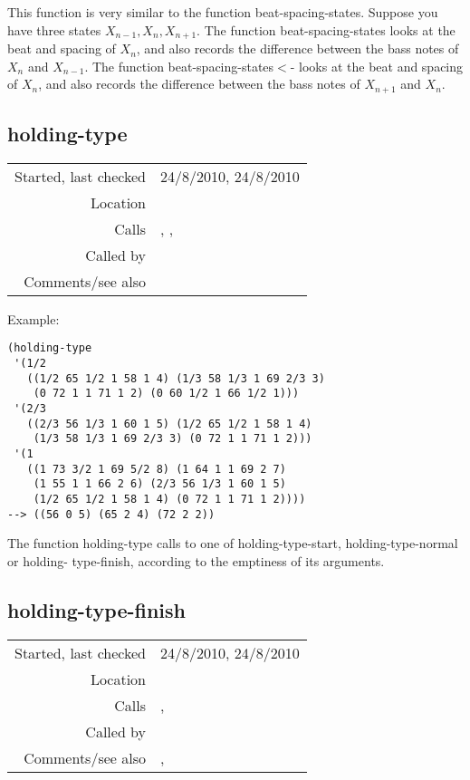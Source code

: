 \noindent This function is very similar to the
function beat-spacing-states. Suppose you have three
states $X_{n-1}, X_n, X_{n+1}$. The function
beat-spacing-states looks at the beat and spacing of
$X_n$, and also records the difference between the
bass notes of $X_n$ and $X_{n-1}$. The function
beat-spacing-states$<$- looks at the beat and spacing
of $X_n$, and also records the difference between the
bass notes of $X_{n+1}$ and $X_n$.


\subsection*{holding-type}\label{fun:holding-type}

\vspace{0.3cm}
\begin{tabular}{r|p{8cm}}
Started, last checked & 24/8/2010, 24/8/2010 \\
Location & \nameref{sec:spacing-states} \\
Calls & \nameref{fun:holding-type-finish}, \nameref{fun:holding-type-normal},\newline \nameref{fun:holding-type-start} \\
Called by & \nameref{fun:holding-types} \\
Comments/see also &
\end{tabular}

\vspace{0.5cm}
\noindent Example:
\begin{verbatim}
(holding-type
 '(1/2
   ((1/2 65 1/2 1 58 1 4) (1/3 58 1/3 1 69 2/3 3)
    (0 72 1 1 71 1 2) (0 60 1/2 1 66 1/2 1)))
 '(2/3
   ((2/3 56 1/3 1 60 1 5) (1/2 65 1/2 1 58 1 4)
    (1/3 58 1/3 1 69 2/3 3) (0 72 1 1 71 1 2)))
 '(1
   ((1 73 3/2 1 69 5/2 8) (1 64 1 1 69 2 7)
    (1 55 1 1 66 2 6) (2/3 56 1/3 1 60 1 5)
    (1/2 65 1/2 1 58 1 4) (0 72 1 1 71 1 2))))
--> ((56 0 5) (65 2 4) (72 2 2))
\end{verbatim}

\noindent The function holding-type calls to one of
holding-type-start, holding-type-normal or holding-
type-finish, according to the emptiness of its
arguments.


\subsection*{holding-type-finish}\label{fun:holding-type-finish}

\vspace{0.3cm}
\begin{tabular}{r|p{8cm}}
Started, last checked & 24/8/2010, 24/8/2010 \\
Location & \nameref{sec:spacing-states} \\
Calls & \nameref{fun:index-item-1st-occurs}, \nameref{fun:nth-list-of-lists} \\
Called by & \nameref{fun:holding-type} \\
Comments/see also & \nameref{fun:holding-type-normal}, \nameref{fun:holding-type-start}
\end{tabular}


